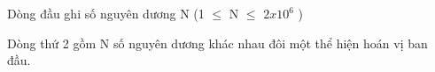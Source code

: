 Dòng đầu ghi số nguyên dương N (1  $\le$  N  $\le$  $2x10^{6}$ )


Dòng thứ 2 gồm N số nguyên dương khác nhau đôi một thể hiện hoán vị ban đầu.